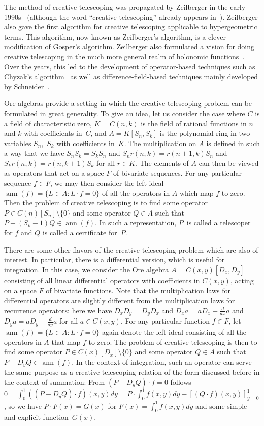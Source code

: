 \documentclass{jssc}
\begin{document}
 The method of creative telescoping was propagated by Zeilberger in the early
 1990s~\cite{wilf90,wilf92a,zeilberger91,petkovsek97}  (although the word ``creative telescoping'' already appears
 in~\cite{vanDerPoorten79}).  Zeilberger also gave the first algorithm for creative
 telescoping applicable to hypergeometric terms. This algorithm, now known as
 Zeilberger's algorithm, is a clever modification of Gosper's algorithm.
 Zeilberger also formulated a vision for doing creative telescoping in the much more
 general realm of holonomic functions~\cite{zeilberger90}. Over the years, this led to the
 development of operator-based techniques such as Chyzak's algorithm~\cite{chyzak98a,chyzak00}
 as well as difference-field-based techniques mainly developed by
 Schneider~\cite{schneider01,schneider08,schneider13b}.


 \def\ann{\operatorname{ann}}%
 Ore algebras provide a setting in which the creative telescoping problem can be formulated
 in great generality. To give an idea, let us consider the case where $C$ is a field of
 characteristic zero,
 $K=C(n,k)$ is the field of rational functions in $n$ and $k$ with coefficients in~$C$, and
 $A=K[S_n,S_k]$ is the polynomial ring in two variables $S_n$,~$S_k$ with coefficients in~$K$.
 The multiplication on $A$ is defined in such a way that we have
 $S_nS_k = S_kS_n$ and
 $S_n r(n,k)=r(n+1,k)S_n$ and
 $S_k r(n,k)=r(n,k+1)S_k$ for all $r\in K$.
 The elements of $A$ can then be viewed as operators that act on a space $F$ of bivariate sequences.
 For any particular sequence $f\in F$, we may then consider the left ideal $\ann(f)=\{L\in A:L\cdot f=0\}$
 of all the operators in $A$ which map $f$ to zero. Then the problem of creative telescoping is
 to find some operator $P\in C(n)[S_n]\setminus\{0\}$ and some operator $Q\in A$ such that $P-(S_k-1)Q\in\ann(f)$.
 In such a representation, $P$~is called a telescoper for $f$ and $Q$ is called a certificate for~$P$.

 There are some other flavors of the creative telescoping problem which are also of interest.
 In particular, there is a differential version, which is useful for integration. In this case,
 we consider the Ore algebra $A=C(x,y)[D_x,D_y]$ consisting of all linear differential operators
 with coefficients in $C(x,y)$, acting on a space $F$ of bivariate functions.
 Note that the multiplication laws for differential operators are slightly different from the multiplication
 laws for recurrence operators: here we have $D_xD_y=D_yD_x$ and $D_xa=aD_x + \frac d{dx}a$ and $D_ya=aD_y+\frac d{dy}a$
 for all $a\in C(x,y)$.
 For any particular function $f\in F$, let $\ann(f)=\{L\in A:L\cdot f=0\}$ again denote the left ideal
 consisting of all the operators in $A$ that map $f$ to zero. The problem of creative telescoping is then
 to find some operator $P\in C(x)[D_x]\setminus\{0\}$ and some operator $Q\in A$ such that $P-D_yQ\in\ann(f)$.
 In the context of integration, such an operator can serve the same purpose as a creative telescoping relation
 of the form discussed before in the context of summation:
 From $(P-D_yQ)\cdot f=0$ follows $0=\int_0^1((P-D_yQ)\cdot f)(x,y)dy=P\cdot\int_0^1 f(x,y)dy-[(Q\cdot f)(x,y)]_{y=0}^{1}$,
 so we have $P\cdot F(x)=G(x)$ for $F(x)=\int_0^1 f(x,y)dy$ and some simple and explicit function~$G(x)$.
\end{document}
